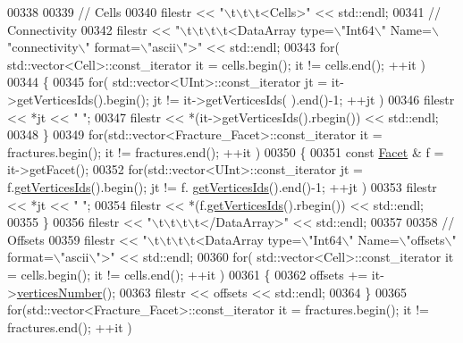 \begin{DoxyCode}
00338 
00339     \textcolor{comment}{// Cells}
00340     filestr << \textcolor{stringliteral}{"\(\backslash\)t\(\backslash\)t\(\backslash\)t<Cells>"} << std::endl;
00341     \textcolor{comment}{//  Connectivity}
00342     filestr << \textcolor{stringliteral}{"\(\backslash\)t\(\backslash\)t\(\backslash\)t\(\backslash\)t<DataArray type=\(\backslash\)"Int64\(\backslash\)" Name=\(\backslash\)"connectivity\(\backslash\)" format=\(\backslash\)"ascii\(\backslash\)">"} << std::endl;
00343     \textcolor{keywordflow}{for}( std::vector<Cell>::const\_iterator it = cells.begin(); it != cells.end(); ++it )
00344     \{
00345         \textcolor{keywordflow}{for}( std::vector<UInt>::const\_iterator jt = it->getVerticesIds().begin(); jt != it->getVerticesIds(
      ).end()-1; ++jt )
00346             filestr << *jt << \textcolor{stringliteral}{" "};
00347         filestr << *(it->getVerticesIds().rbegin()) << std::endl;
00348     \}
00349     \textcolor{keywordflow}{for}(std::vector<Fracture\_Facet>::const\_iterator it = fractures.begin(); it != fractures.end(); ++it )
00350     \{
00351         \textcolor{keyword}{const} \hyperlink{classFVCode3D_1_1Rigid__Mesh_1_1Facet}{Facet} & f = it->getFacet();
00352         \textcolor{keywordflow}{for}(std::vector<UInt>::const\_iterator jt = f.\hyperlink{classFVCode3D_1_1Rigid__Mesh_1_1Facet_af92ad0b6b79c69f6c04584301b8998a7}{getVerticesIds}().begin(); jt != f.
      \hyperlink{classFVCode3D_1_1Rigid__Mesh_1_1Facet_af92ad0b6b79c69f6c04584301b8998a7}{getVerticesIds}().end()-1; ++jt )
00353             filestr << *jt << \textcolor{stringliteral}{" "};
00354         filestr << *(f.\hyperlink{classFVCode3D_1_1Rigid__Mesh_1_1Facet_af92ad0b6b79c69f6c04584301b8998a7}{getVerticesIds}().rbegin()) << std::endl;
00355     \}
00356     filestr << \textcolor{stringliteral}{"\(\backslash\)t\(\backslash\)t\(\backslash\)t\(\backslash\)t</DataArray>"} << std::endl;
00357 
00358     \textcolor{comment}{//  Offsets}
00359     filestr << \textcolor{stringliteral}{"\(\backslash\)t\(\backslash\)t\(\backslash\)t\(\backslash\)t<DataArray type=\(\backslash\)"Int64\(\backslash\)" Name=\(\backslash\)"offsets\(\backslash\)" format=\(\backslash\)"ascii\(\backslash\)">"} << std::endl;
00360     \textcolor{keywordflow}{for}( std::vector<Cell>::const\_iterator it = cells.begin(); it != cells.end(); ++it )
00361     \{
00362         offsets += it->\hyperlink{classFVCode3D_1_1Rigid__Mesh_1_1Facet_a5d18db39a0eeb85e6a4afc2b09813201}{verticesNumber}();
00363         filestr << offsets << std::endl;
00364     \}
00365     \textcolor{keywordflow}{for}(std::vector<Fracture\_Facet>::const\_iterator it = fractures.begin(); it != fractures.end(); ++it )

\end{DoxyCode}
